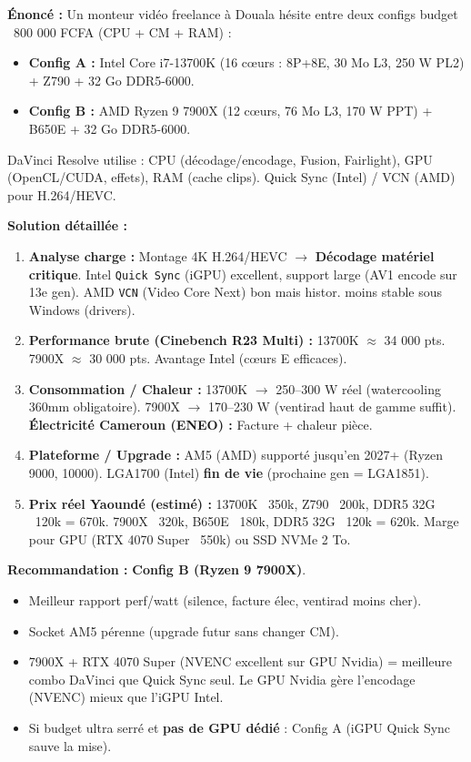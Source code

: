 \documentclass[11pt]{article}
\begin{document}
\begin{exoresolu}
\textbf{Énoncé :} Un monteur vidéo freelance à Douala hésite entre deux configs budget ~800 000 FCFA (CPU + CM + RAM) :
\begin{itemize}
    \item \textbf{Config A :} Intel Core i7-13700K (16 cœurs : 8P+8E, 30 Mo L3, 250 W PL2) + Z790 + 32 Go DDR5-6000.
    \item \textbf{Config B :} AMD Ryzen 9 7900X (12 cœurs, 76 Mo L3, 170 W PPT) + B650E + 32 Go DDR5-6000.
\end{itemize}
DaVinci Resolve utilise : CPU (décodage/encodage, Fusion, Fairlight), GPU (OpenCL/CUDA, effets), RAM (cache clips). Quick Sync (Intel) / VCN (AMD) pour H.264/HEVC.

\textbf{Solution détaillée :}
\begin{enumerate}
    \item \textbf{Analyse charge :} Montage 4K H.264/HEVC $\to$ \textbf{Décodage matériel critique}. Intel \texttt{Quick Sync} (iGPU) excellent, support large (AV1 encode sur 13e gen). AMD \texttt{VCN} (Video Core Next) bon mais histor. moins stable sous Windows (drivers).
    \item \textbf{Performance brute (Cinebench R23 Multi) :} 13700K $\approx$ 34 000 pts. 7900X $\approx$ 30 000 pts. Avantage Intel (cœurs E efficaces).
    \item \textbf{Consommation / Chaleur :} 13700K $\to$ 250--300 W réel (watercooling 360mm obligatoire). 7900X $\to$ 170--230 W (ventirad haut de gamme suffit). \textbf{Électricité Cameroun (ENEO) :} Facture + chaleur pièce.
    \item \textbf{Plateforme / Upgrade :} AM5 (AMD) supporté jusqu'en 2027+ (Ryzen 9000, 10000). LGA1700 (Intel) \textbf{fin de vie} (prochaine gen = LGA1851).
    \item \textbf{Prix réel Yaoundé (estimé) :} 13700K ~350k, Z790 ~200k, DDR5 32G ~120k = 670k. 7900X ~320k, B650E ~180k, DDR5 32G ~120k = 620k. Marge pour GPU (RTX 4070 Super ~550k) ou SSD NVMe 2 To.
\end{enumerate}
\tcblower
\textbf{Recommandation :} \textbf{Config B (Ryzen 9 7900X)}.
\begin{itemize}
    \item Meilleur rapport perf/watt (silence, facture élec, ventirad moins cher).
    \item Socket AM5 pérenne (upgrade futur sans changer CM).
    \item 7900X + RTX 4070 Super (NVENC excellent sur GPU Nvidia) = meilleure combo DaVinci que Quick Sync seul. Le GPU Nvidia gère l'encodage (NVENC) mieux que l'iGPU Intel.
    \item Si budget ultra serré et \textbf{pas de GPU dédié} : Config A (iGPU Quick Sync sauve la mise).
\end{itemize}
\end{exoresolu}
\end{document}
